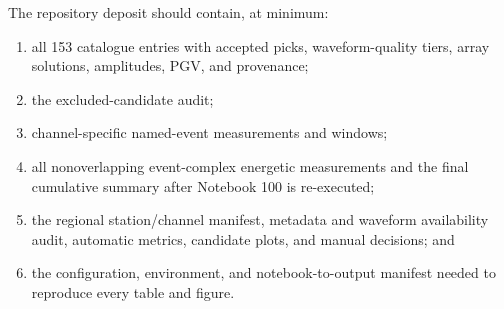 \documentclass[]{seismica}
\begin{document}
The repository deposit should contain, at minimum:
\begin{enumerate}
  \item all 153 catalogue entries with accepted picks, waveform-quality tiers,
        array solutions, amplitudes, PGV, and provenance;
  \item the excluded-candidate audit;
  \item channel-specific named-event measurements and windows;
  \item all nonoverlapping event-complex energetic measurements and the final
        cumulative summary after Notebook 100 is re-executed;
  \item the regional station/channel manifest, metadata and waveform
        availability audit, automatic metrics, candidate plots, and manual
        decisions; and
  \item the configuration, environment, and notebook-to-output manifest needed
        to reproduce every table and figure.
\end{enumerate}


\end{document}
